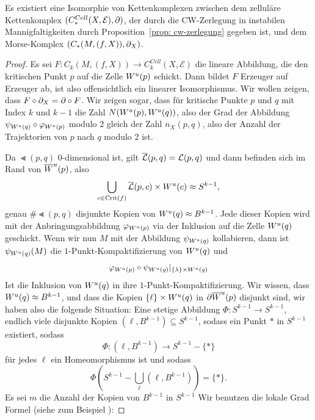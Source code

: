 \begin{theorem}
    \label{satz: morse-homologie ist zellulaere homologie}
    Es existiert eine Isomorphie von Kettenkomplexen zwischen dem zelluläre Kettenkomplex 
    $(C^{Cell}_{\ast}(X, \mathcal{E}), { \partial })$, der durch die CW-Zerlegung in instabilen 
    Mannigfaltigkeiten durch 
    Proposition~\ref{prop: cw-zerlegung} gegeben ist, und dem Morse-Komplex 
    $(C_{\ast}(M, (f, X)), { \partial }_X)$.
\end{theorem}

\begin{proof}
    Es sei $F \colon C_k (M, (f, X)) \to C^{Cell}_k(X, \mathcal{E})$ die lineare Abbildung, 
    die den kritischen Punkt $p$
    auf die Zelle ${ W^u } (p)$ schickt. Dann bildet $F$ Erzeuger auf Erzeuger ab, ist also 
    offensichtlich ein linearer Isomorphismus. Wir wollen zeigen, dass 
    $F \circ { \partial }_X = { \partial } \circ F$. Wir zeigen sogar, dass für kritische Punkte $p$ und $q$ mit 
    Index $k$ und $k - 1$ die Zahl $N ({ W^u } (p), { W^u } (q))$, also der Grad der Abbildung 
    $\psi_{{ W^u } (q)} \circ \varphi_{{ W^u } (p)}$ modulo $2$ gleich der Zahl $n_X(p, q)$, also 
    der Anzahl der Trajektorien von $p$ nach $q$ modulo $2$ ist. 

    Da $\Lt (p, q)$ $0$-dimensional ist, gilt ${\overline{\mathcal{L}} } (p, q) = { \mathcal{L} } (p, q)$ und dann befinden sich im 
    Rand von ${ \overline{W}^u } (p)$, also 
    \[ \bigcup_{c \in { \operatorname{Crit} } (f)} {\overline{\mathcal{L}} } (p, c) \times { W^u } (c) \approx S^{k - 1} , \] 
    genau $\# \Lt (p, q)$ disjunkte Kopien von ${ W^u } (q) \approx B^{k - 1}$. Jede dieser Kopien 
    wird mit der Anbringungsabbildung $\varphi_{{ W^u } (p)}$ via der Inklusion auf die Zelle ${ W^u } (q)$
    geschickt. Wenn wir nun $M$ mit der Abbildung $\psi_{{ W^u } (q)}$ kollabieren, dann ist 
    $\psi_{{ W^u } (q)} (M)$ die $1$-Punkt-Kompaktifizierung von ${ W^u } (q)$ und 
    \[ \varphi_{{ W^u } (p)} \circ \psi_{{ W^u } (q)} |_{ \{ \lambda \} \times { W^u } (q) } \]
    Ist die Inklusion von ${ W^u } (q)$ in ihre $1$-Punkt-Kompaktifizierung. Wir wissen, dass 
    ${ W^u } (q) \approx B^{k - 1}$, und dass die Kopien $\{ \ell \} \times { W^u } (q)$ in 
    ${ \partial } { \overline{W}^u } (p)$ disjunkt sind, wir haben also die folgende Situation:
    Eine stetige Abbildung $\Phi \colon S^{k - 1} \to S^{k - 1}$, endlich viele disjunkte Kopien 
    $(\ell, B^{k - 1}) \subseteq S^{k - 1}$, sodass ein Punkt $\ast$ in $S^{k - 1}$ existiert, sodass
    \[ \Phi \colon (\ell, B^{k - 1}) \to S^{k - 1} - \{ \ast \} \]
    für jedes $\ell$ ein Homeomorphismus ist und sodass
    \[ \Phi \left( S^{k - 1} - \bigcup_{\ell} \left( \ell, B^{k - 1} \right) \right) = \{ \ast \} . \]
    Es sei $m$ die Anzahl der Kopien von $B^{k - 1}$ in $S^{k - 1}$
    Wir benutzen die lokale Grad Formel (siehe zum Beispiel \cite{hatcher}): 
    

\end{proof}
